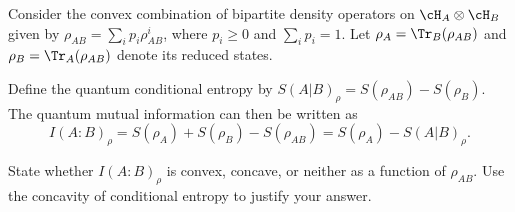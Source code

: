 Consider the convex combination of bipartite density operators on $\cH_A\otimes \cH_B$ given by $\rho_{AB}=\sum_i p_i\rho_{AB}^i$, where $p_i\geq 0$ and $\sum_i p_i=1$. Let $\rho_A=\Tr_B(\rho_{AB})$ and $\rho_B=\Tr_A(\rho_{AB})$ denote its reduced states.

Define the quantum conditional entropy by $S(A|B)_\rho=S(\rho_{AB})-S(\rho_B)$. The quantum mutual information can then be written as
$$
I(A:B)_\rho
=
S(\rho_A)+S(\rho_B)-S(\rho_{AB})
=
S(\rho_A)-S(A|B)_\rho.
$$

State whether $I(A:B)_\rho$ is convex, concave, or neither as a function of $\rho_{AB}$. Use the concavity of conditional entropy to justify your answer.

